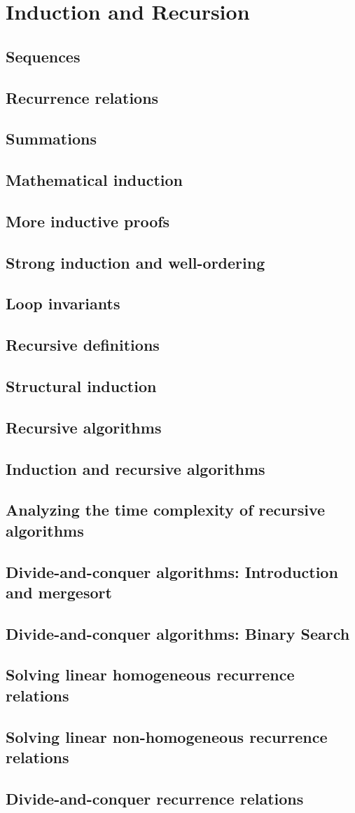 \section{Induction and Recursion}
\subsection{Sequences}
\subsection{Recurrence relations}
\subsection{Summations}
\subsection{Mathematical induction}
\subsection{More inductive proofs}
\subsection{Strong induction and well-ordering}
\subsection{Loop invariants}
\subsection{Recursive definitions}
\subsection{Structural induction}
\subsection{Recursive algorithms}
\subsection{Induction and recursive algorithms}
\subsection{Analyzing the time complexity of recursive algorithms}
\subsection{Divide-and-conquer algorithms: Introduction and mergesort}
\subsection{Divide-and-conquer algorithms: Binary Search}
\subsection{Solving linear homogeneous recurrence relations}
\subsection{Solving linear non-homogeneous recurrence relations}
\subsection{Divide-and-conquer recurrence relations}